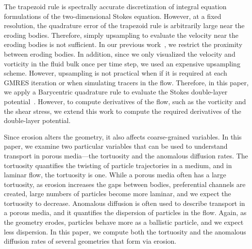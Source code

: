 \documentclass[preprint, 10pt]{elsarticle}
\begin{document}
The trapezoid rule is spectrally accurate discretization of integral
equation formulations of the two-dimensional Stokes equation.  However,
at a fixed resolution, the quadrature error of the trapezoid rule is
arbitrarily large near the eroding bodies.  Therefore, simply upsampling
to evaluate the velocity near the eroding bodies is not sufficient.  In
our previous work~\cite{qua-moo2018}, we restrict the proximity between
eroding bodies.  In addition, since we only visualized the velocity and
vorticity in the fluid bulk once per time step, we used an expensive
upsampling scheme.  However, upsampling is not practical when if it is
required at each GMRES iteration or when simulating tracers in the flow.
Therefore, in this paper, we apply a Barycentric quadrature rule to
evaluate the Stokes double-layer potential~\cite{bar-wu-vee2015}.
However, to compute derivatives of the flow, such as the vorticity and
the shear stress, we extend this work to compute the required
derivatives of the double-layer potential.

Since erosion alters the geometry, it also affects coarse-grained
variables.  In this paper, we examine two particular variables that can
be used to understand transport in porous media---the tortuosity and the
anomalous diffusion rates.   The tortuosity quantifies the twisting of
particle trajectories in a medium, and in laminar flow, the tortuosity
is one.  While a porous media often has a large tortuosity, as erosion
increases the gaps between bodies, preferential channels are created,
large numbers of particles become more laminar, and we expect the
tortuosity to decrease.  Anomalous diffusion is often used to describe
transport in a porous media, and it quantifies the dispersion of
particles in the flow.  Again, as the geometry erodes, particles behave
more as a ballistic particle, and we expect less dispersion.  In this
paper, we compute both the tortuosity and the anomalous diffusion rates
of several geometries that form via erosion.


\end{document}
